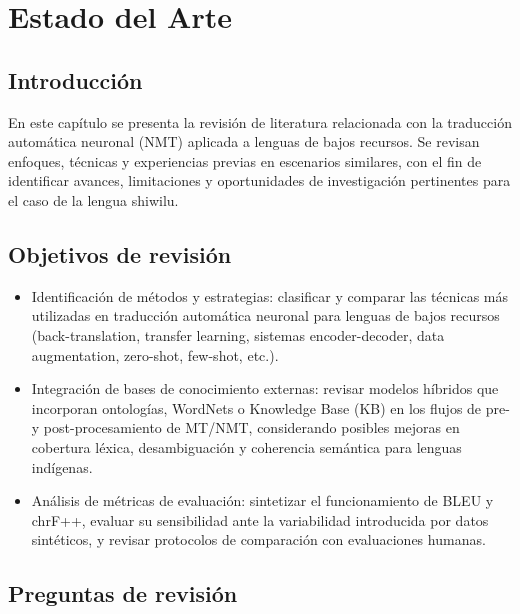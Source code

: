 \documentclass[12pt,a4paper,oneside]{book}
\begin{document}

\chapter{Estado del Arte}\label{estado-del-arte}

\section{Introducción}\label{introducciuxf3n-1}

En este capítulo se presenta la revisión de literatura relacionada con la traducción automática neuronal (NMT) aplicada a lenguas de bajos recursos. Se revisan enfoques, técnicas y experiencias previas en escenarios similares, con el fin de identificar avances, limitaciones y oportunidades de investigación pertinentes para el caso de la lengua shiwilu.

\section{Objetivos de revisión}\label{objetivos-de-revisiuxf3n}

\begin{itemize}
\item
  Identificación de métodos y estrategias: clasificar y comparar las técnicas más utilizadas en traducción automática neuronal para lenguas de bajos recursos (back-translation, transfer learning, sistemas encoder-decoder, data augmentation, zero-shot, few-shot, etc.).
\item
  Integración de bases de conocimiento externas: revisar modelos híbridos que incorporan ontologías, WordNets o Knowledge Base (KB) en los flujos de pre- y post-procesamiento de MT/NMT, considerando posibles mejoras en cobertura léxica, desambiguación y coherencia semántica para lenguas indígenas.
\item
  Análisis de métricas de evaluación: sintetizar el funcionamiento de BLEU y chrF++, evaluar su sensibilidad ante la variabilidad introducida por datos sintéticos, y revisar protocolos de comparación con evaluaciones humanas.
\end{itemize}

\section{Preguntas de revisión}\label{preguntas-de-revisiuxf3n}
\end{document}
